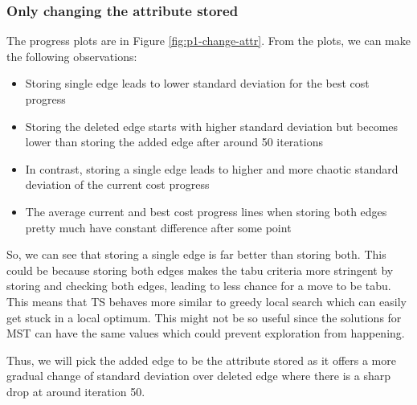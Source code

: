 \subsubsection{Only changing the attribute stored}

The progress plots are in Figure \ref{fig:p1-change-attr}. From the plots, we can make the following observations:
\begin{itemize}
    \item Storing single edge leads to lower standard deviation for the best cost progress
    \item Storing the deleted edge starts with higher standard deviation but becomes lower than storing the added edge after around 50 iterations
    \item In contrast, storing a single edge leads to higher and more chaotic standard deviation of the current cost progress
    \item The average current and best cost progress lines when storing both edges pretty much have constant difference after some point
\end{itemize}

So, we can see that storing a single edge is far better than storing both. This could be because storing both edges makes the tabu criteria more stringent by storing and checking both edges, leading to less chance for a move to be tabu. This means that TS behaves more similar to greedy local search which can easily get stuck in a local optimum. This might not be so useful since the solutions for MST can have the same values which could prevent exploration from happening.

Thus, we will pick the added edge to be the attribute stored as it offers a more gradual change of standard deviation over deleted edge where there is a sharp drop at around iteration 50.

